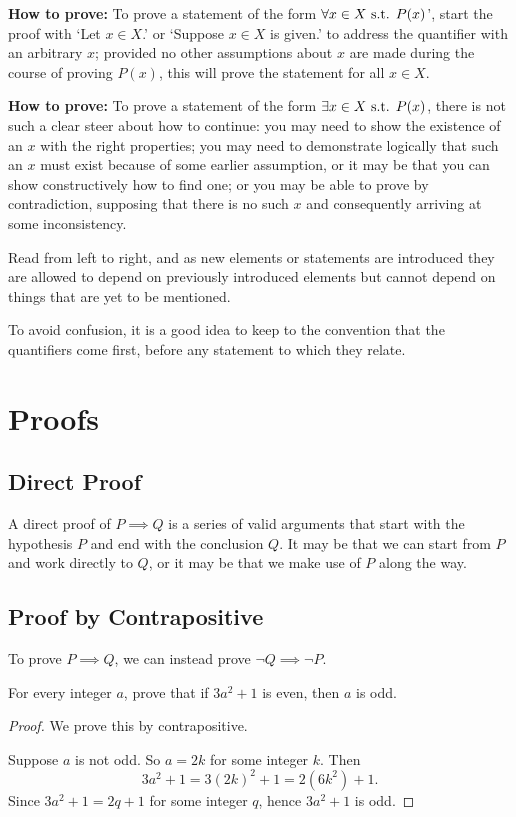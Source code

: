 \textbf{How to prove:} To prove a statement of the form $\forall x \in X \text{ s.t. } P(x)$’, start the proof with ‘Let $x \in X$.’ or ‘Suppose $x \in X$ is given.’ to address the quantifier with an arbitrary $x$; provided no other assumptions about $x$ are made during the course of proving $P(x)$, this will prove the statement for all $x \in X$. 

\textbf{How to prove:} To prove a statement of the form $\exists x \in X \text{ s.t. } P(x)$, there is not such a clear steer about how to continue: you may need to show the existence of an $x$ with the right properties; you may need to demonstrate logically that such an $x$ must exist because of some earlier assumption, or it may be that you can show constructively how to find one; or you may be able to prove by contradiction, supposing that there is no such $x$ and consequently arriving at some inconsistency.

\begin{remark}
Read from left to right, and as new elements or statements are introduced they are allowed to depend on previously introduced elements but cannot depend on things that are yet to be mentioned.
\end{remark}

\begin{remark}
To avoid confusion, it is a good idea to keep to the convention that the quantifiers come first, before any statement to which they relate.
\end{remark}
\pagebreak

\section{Proofs}
\subsection{Direct Proof}
A direct proof of $P \implies Q$ is a series of valid arguments that start with the hypothesis $P$ and end with the conclusion $Q$. It may be that we can start from $P$ and work directly to $Q$, or it may be that we make use of $P$ along the way.

\subsection{Proof by Contrapositive}
To prove $P \implies Q$, we can instead prove $\lnot Q \implies \lnot P$.

\begin{exercise}{}{}
For every integer $a$, prove that if $3a^2+1$ is even, then $a$ is odd.
\end{exercise}
\begin{proof}
We prove this by contrapositive.

Suppose $a$ is not odd. So $a=2k$ for some integer $k$. Then
\[ 3a^2+1=3(2k)^2+1=2(6k^2)+1. \]
Since $3a^2+1=2q+1$ for some integer $q$, hence $3a^2+1$ is odd.
\end{proof}

